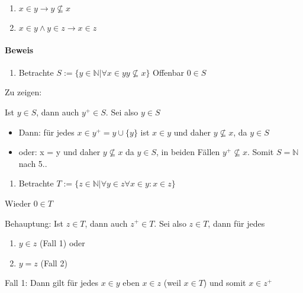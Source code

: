 \documentclass{../../meta/tudscript}
\begin{document}
\begin{enumerate}
\def\labelenumi{\arabic{enumi}.}
\item
  \(x \in y \rightarrow y \nsubseteq x\)
\item
  \(x \in y \wedge y \in z \rightarrow x \in z\)
\end{enumerate}

\paragraph{Beweis}

\begin{enumerate}
\def\labelenumi{\roman{enumi})}

\item
  Betrachte
  \(S := \{y \in \mathbb{N} | \forall x \in y y \nsubseteq x \}\)
  Offenbar \(0 \in S\)
\end{enumerate}

Zu zeigen:

Ist \(y \in S\), dann auch \(y^+ \in S\). Sei also \(y \in S\)

\begin{itemize}
\item
  Dann: für jedes \(x \in y^+ = y \cup \{y\}\) ist \(x \in y\) und daher
  \(y \nsubseteq x\), da \(y \in S\)
\item
  oder: x = y und daher \(y \nsubseteq x\) da \(y \in S\), in beiden
  Fällen \(y^+ \nsubseteq x\). Somit \(S = \mathbb{N}\) nach 5..
\end{itemize}

\begin{enumerate}
\def\labelenumi{\roman{enumi})}
\setcounter{enumi}{1}

\item
  Betrachte
  \(T := \{z \in \mathbb{N} | \forall y \in z \forall x \in y: x \in z\}\)
\end{enumerate}

Wieder \(0 \in T\)

Behauptung: Ist \(z \in T\), dann auch \(z^+ \in T\). Sei also
\(z \in T\), dann für jedes

\begin{enumerate}
\def\labelenumi{\arabic{enumi}.}
\item
  \(y \in z\) (Fall 1) oder
\item
  \(y=z\) (Fall 2)
\end{enumerate}

Fall 1: Dann gilt für jedes \(x \in y\) eben \(x \in z\) (weil
\(x \in T\)) und somit \(x \in z^+\)
\end{document}
